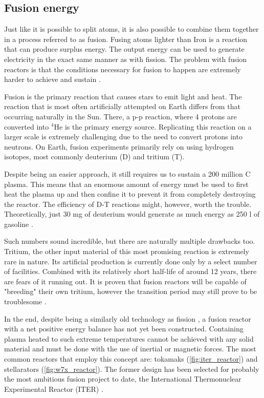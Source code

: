 \subsection{Fusion energy}

  Just like it is possible to split atoms, it is also possible to
  combine them together in a process referred to as fusion. 
  Fusing atoms lighter than Iron is a
  reaction that can produce surplus energy.
  The output energy can be used to generate electricity in
  the exact same manner as with fission. 
  The problem with fusion reactors is that the conditions necessary
  for fusion to happen are extremely harder to achieve and sustain 
  \cite{structural_materials_fusion}.


  Fusion is the primary reaction that causes stars to emit light and heat.
  The reaction that is most often artificially attempted on Earth differs
  from that occurring naturally in the Sun. There, a p-p reaction, 
  where 4 protons are converted into ${}^{4}$He is the primary energy source.
  Replicating this reaction on a larger scale is extremely challenging 
  due to the need to convert protons into neutrons.
  On Earth, fusion experiments primarily rely on using hydrogen isotopes, 
  most commonly deuterium (D) and tritium (T).


  Despite being an easier approach, it still requires us to sustain
  a 200 million \degree C plasma. This means that an enormous amount of energy
  must be used to first heat the plasma up and then confine it to 
  prevent it from completely destroying the reactor. 
  The efficiency of D-T reactions might, however, worth the trouble.
  Theoretically, just 30 mg of deuterium would generate as much energy
  as 250 l of gasoline \cite{nuclear_fusion_status}. 


  Such numbers sound incredible, but there are naturally multiple drawbacks too.
  Tritium, the other input material of this most promising reaction is
  extremely rare in nature. Its artificial production is currently 
  done only by a select number of facilities. 
  Combined with its relatively short half-life of around 12 years, 
  there are fears of it running out. It is proven that fusion reactors
  will be capable of "breeding" their own tritium, however the transition period 
  may still prove to be troublesome \cite{fusion_fuel_running_out}.


  In the end, despite being a similarly old technology as fission
  \cite{fusion_history},
  a fusion reactor with a net positive energy balance
  has not yet been constructed. Containing plasma heated to such extreme
  temperatures cannot be achieved with any solid material and must 
  be done with the use of inertial or magnetic forces. 
  The most common reactors that employ this concept are:
  tokamaks (\autoref{fig:iter_reactor}) 
  and stellarators (\autoref{fig:w7x_reactor}).
  The former design has been selected for probably
  the most ambitious fusion project to date, 
  the International Thermonuclear Experimental Reactor (ITER)
  \cite{nuclear_fusion_status}.

